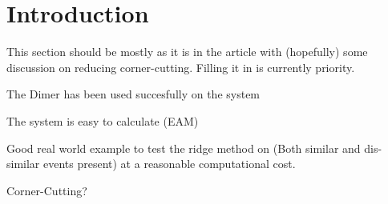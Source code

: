 \section{Introduction}
\label{sec:al-introduction}

This section should be mostly as it is in the article with (hopefully) some discussion on reducing corner-cutting.
Filling it in is currently  priority.

\bit
\item The Dimer has been used succesfully on the system
\item The system is easy to calculate (EAM)
\item Good real world example to test the ridge method on (Both similar and dis-similar events present) at a reasonable computational cost.
\item Corner-Cutting?
\eit

\placeholder

